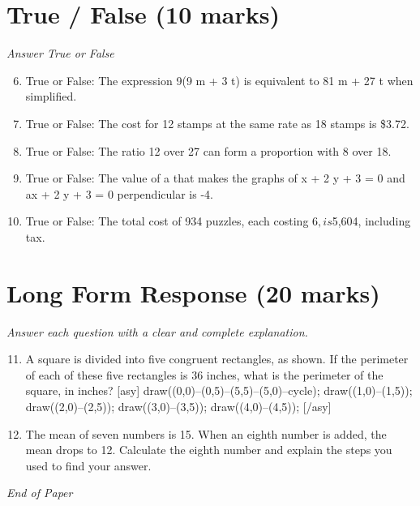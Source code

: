 \documentclass[12pt]{article}
\begin{document}
\section*{True / False (10 marks)}
\textit{Answer True or False}
\begin{enumerate}[label=\arabic*.]
\setcounter{enumi}{5}
\item True or False: The expression 9(9 m + 3 t) is equivalent to 81 m + 27 t when simplified.
\item True or False: The cost for 12 stamps at the same rate as 18 stamps is \$3.72.
\item True or False: The ratio 12 over 27 can form a proportion with 8 over 18.
\item True or False: The value of a that makes the graphs of x + 2 y + 3 = 0 and ax + 2 y + 3 = 0 perpendicular is -4.
\item True or False: The total cost of 934 puzzles, each costing $6, is $5,604, including tax.
\end{enumerate}

\section*{Long Form Response (20 marks)}
\textit{Answer each question with a clear and complete explanation.}
\begin{enumerate}[label=\arabic*.]
\setcounter{enumi}{10}
\item A square is divided into five congruent rectangles, as shown. If the perimeter of each of these five rectangles is 36 inches, what is the perimeter of the square, in inches? [asy] draw((0,0)--(0,5)--(5,5)--(5,0)--cycle); draw((1,0)--(1,5)); draw((2,0)--(2,5)); draw((3,0)--(3,5)); draw((4,0)--(4,5)); [/asy]
\item The mean of seven numbers is 15. When an eighth number is added, the mean drops to 12. Calculate the eighth number and explain the steps you used to find your answer.
\end{enumerate}

\vfill
\noindent\textit{End of Paper}
\end{document}
